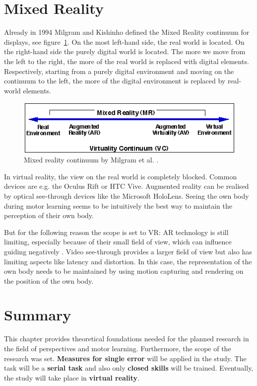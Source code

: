 \section{Mixed Reality}
Already in 1994 Milgram and Kishinho \cite{Milgram1994} defined the Mixed Reality continuum for displays, see figure~\ref{fig:MRcont}. On the most left-hand side, the real world is located. On the right-hand side the purely digital world is located. The more we move from the left to the right, the more of the real world is replaced with digital elements. Respectively, starting from a purely digital environment and moving on the continuum to the left, the more of the digital environment is replaced by real-world elements.
\begin{figure}
	\centering
	\includegraphics[width=1.0\textwidth]{img/milgram_continuum.png}
	\caption{Mixed reality continuum by Milgram et al. \cite{Milgram1994}.}
	\label{fig:MRcont}
\end{figure}
In virtual reality, the view on the real world is completely blocked. Common devices are e.g. the Oculus Rift or HTC Vive. Augmented reality can be realised by optical see-through devices like the Microsoft HoloLens. Seeing the own body during motor learning seems to be intuitively the best way to maintain the perception of their own body.
\begin{tcolorbox}[colback=red!30!white]
But for the following reason the scope is set to VR: AR technology is still limiting, especially because of their small field of view, which can influence guiding negatively \cite{Katzakis2017}. Video see-through provides a larger field of view but also has limiting aspects like latency and distortion. In this case, the representation of the own body needs to be maintained by using motion capturing and rendering on the position of the own body.
\end{tcolorbox}

\section{Summary}
This chapter provides theoretical foundations needed for the planned research in the field of perspectives and motor learning. Furthermore, the scope of the research was set. \textbf{Measures for single error} will be applied in the study. The task will be a \textbf{serial task} and also only \textbf{closed skills} will be trained. Eventually, the study will take place in \textbf{virtual reality}.